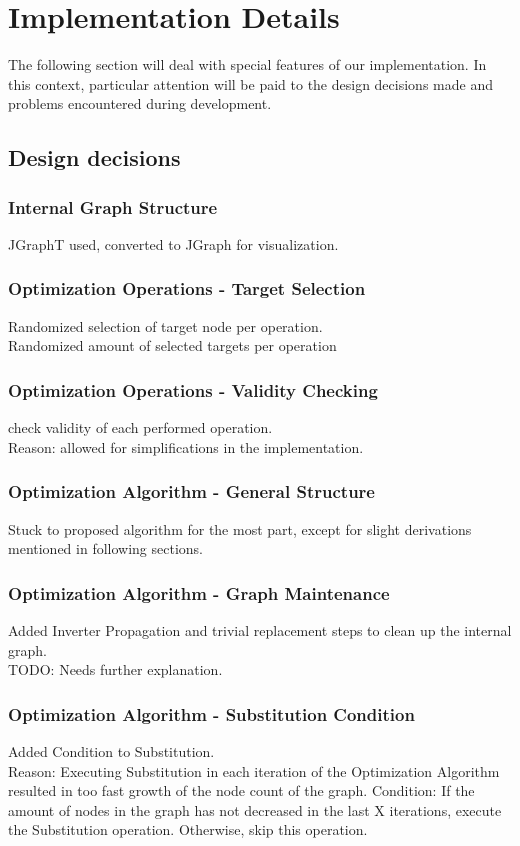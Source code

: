 \documentclass[
	accentcolor=1c,%
	type=intern,
	marginpar=false,
	ruledheaders=section,
	class=report,
	BCOR=5mm,
      parskip=half-,
	fontsize=10pt
	]{tudapub}
\begin{document}
	\newpage
	\section{Implementation Details}
	The following section will deal with special features of our implementation.
	In this context, particular attention will be paid to the design decisions made and problems encountered during development.
		\subsection{Design decisions}
			\subsubsection{Internal Graph Structure}
				JGraphT used, converted to JGraph for visualization.
			\subsubsection{Optimization Operations - Target Selection}
				Randomized selection of target node per operation.\\
				Randomized amount of selected targets per operation
			\subsubsection{Optimization Operations - Validity Checking}
				check validity of each performed operation.\\
				Reason: allowed for simplifications in the implementation.
			\subsubsection{Optimization Algorithm - General Structure}
				Stuck to proposed algorithm for the most part, except for slight derivations mentioned in following sections.
			\subsubsection{Optimization Algorithm - Graph Maintenance}
				Added Inverter Propagation and trivial replacement steps to clean up the internal graph.\\
				TODO: Needs further explanation.
			\subsubsection{Optimization Algorithm - Substitution Condition}
				Added Condition to Substitution.\\
				Reason: Executing Substitution in each iteration of the Optimization Algorithm resulted in too fast growth of the node count of the graph.
				Condition: If the amount of nodes in the graph has not decreased in the last X iterations, execute the Substitution operation. Otherwise, skip this operation.
\end{document}
